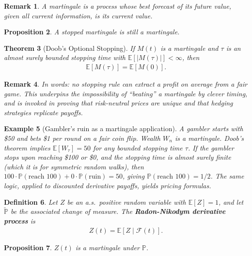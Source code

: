 \documentclass{report}
\theoremstyle{spacedplain}
\newtheorem{theorem}{Theorem}[section]
\newtheorem{proposition}[theorem]{Proposition}
\theoremstyle{spaceddefinition}
\newtheorem{definition}[theorem]{Definition}
\newtheorem{example}[theorem]{Example}
\theoremstyle{spacedremark}
\newtheorem{remark}[theorem]{Remark}
\begin{document}
\begin{remark}
A martingale is a process whose best forecast of its future value, given all current information, is its current value.
\end{remark}

\begin{proposition}
A stopped martingale is still a martingale.
\end{proposition}

\begin{theorem}[Doob's Optional Stopping]
If $M(t)$ is a martingale and $\tau$ is an almost surely bounded stopping time with $\mathbb{E}[|M(\tau)|] < \infty$, then
\begin{align}
    \mathbb{E}[M(\tau)] = \mathbb{E}[M(0)].
\end{align}
\end{theorem}

\begin{remark}
In words: no stopping rule can extract a profit on average from a fair game. This underpins the impossibility of ``beating'' a martingale by clever timing, and is invoked in proving that risk-neutral prices are unique and that hedging strategies replicate payoffs.
\end{remark}

\begin{example}[Gambler's ruin as a martingale application]
A gambler starts with \$50 and bets \$1 per round on a fair coin flip. Wealth $W_n$ is a martingale. Doob's theorem implies $\mathbb{E}[W_\tau] = 50$ for any bounded stopping time $\tau$. If the gambler stops upon reaching \$100 or \$0, and the stopping time is almost surely finite (which it is for symmetric random walks), then $100 \cdot \mathbb{P}(\text{reach 100}) + 0 \cdot \mathbb{P}(\text{ruin}) = 50$, giving $\mathbb{P}(\text{reach 100}) = 1/2$. The same logic, applied to discounted derivative payoffs, yields pricing formulas.
\end{example}

\begin{definition}
Let $Z$ be an a.s.\ positive random variable with $\mathbb{E}[Z] = 1$, and let $\widetilde{\mathbb{P}}$ be the associated change of measure. The \textbf{Radon-Nikodym derivative process} is
\begin{align}
    Z(t) = \mathbb{E}[Z \mid \mathcal{F}(t)].
\end{align}
\end{definition}

\begin{proposition}
$Z(t)$ is a martingale under $\mathbb{P}$.
\end{proposition}
\end{document}
